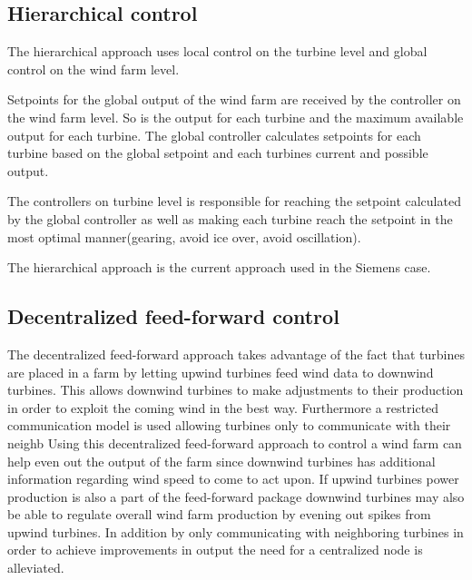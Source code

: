 \subsection{Hierarchical control}
The hierarchical approach uses local control on the turbine level and global control on the wind farm level\cite{HeirarchicalWindFarmControl}.

Setpoints for the global output of the wind farm are received by the controller on the wind farm level.
So is the output for each turbine and the maximum available output for each turbine.
The global controller calculates setpoints for each turbine based on the global setpoint and each turbines current and possible output.

The controllers on turbine level is responsible for reaching the setpoint calculated by the global controller as well as making each turbine reach the setpoint in the most optimal manner(gearing, avoid ice over, avoid oscillation).

The hierarchical approach is the current approach used in the Siemens case.

\subsection{Decentralized feed-forward control}
The decentralized feed-forward approach\cite{DecentralisedFeedforwardControlOfWindFarms} takes advantage of the fact that turbines are placed in a farm by letting upwind turbines feed wind data to downwind turbines. 
This allows downwind turbines to make adjustments to their production in order to exploit the coming wind in the best way.
Furthermore a restricted communication model is used allowing turbines only to communicate with their neighb
Using this decentralized feed-forward approach to control a wind farm can help even out the output of the farm since downwind turbines has additional information regarding wind speed to come to act upon. If upwind turbines power production is also a part of the feed-forward package downwind turbines may also be able to regulate overall wind farm production by evening out spikes from upwind turbines.
In addition by only communicating with neighboring turbines in order to achieve improvements in output the need for a centralized node is alleviated.

